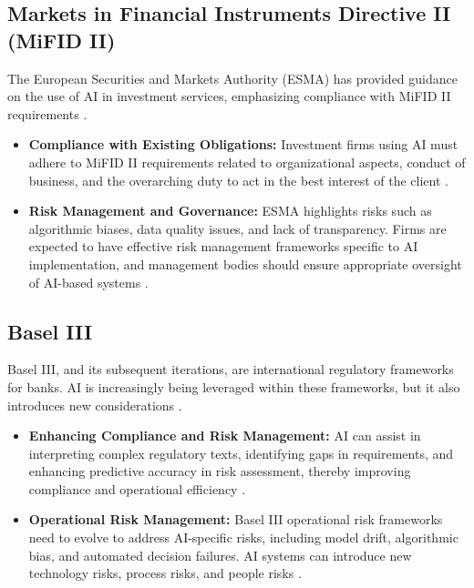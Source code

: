 \subsection{Markets in Financial Instruments Directive II (MiFID II)}
The European Securities and Markets Authority (ESMA) has provided guidance on the use of AI in investment services, emphasizing compliance with MiFID II requirements \cite{TaylorWessing_MiFID_II}.
\begin{itemize}
    \item \textbf{Compliance with Existing Obligations:} Investment firms using AI must adhere to MiFID II requirements related to organizational aspects, conduct of business, and the overarching duty to act in the best interest of the client \cite{Linklaters_MiFID_II}.
    \item \textbf{Risk Management and Governance:} ESMA highlights risks such as algorithmic biases, data quality issues, and lack of transparency. Firms are expected to have effective risk management frameworks specific to AI implementation, and management bodies should ensure appropriate oversight of AI-based systems \cite{RegulationTomorrow_MiFID_II}.
\end{itemize}

\subsection{Basel III}
Basel III, and its subsequent iterations, are international regulatory frameworks for banks. AI is increasingly being leveraged within these frameworks, but it also introduces new considerations \cite{Medium_Basel_III}.
\begin{itemize}
    \item \textbf{Enhancing Compliance and Risk Management:} AI can assist in interpreting complex regulatory texts, identifying gaps in requirements, and enhancing predictive accuracy in risk assessment, thereby improving compliance and operational efficiency \cite{RiskCompliance_Basel_III}.
    \item \textbf{Operational Risk Management:} Basel III operational risk frameworks need to evolve to address AI-specific risks, including model drift, algorithmic bias, and automated decision failures. AI systems can introduce new technology risks, process risks, and people risks \cite{BIS_Basel_III}.
\end{itemize}

